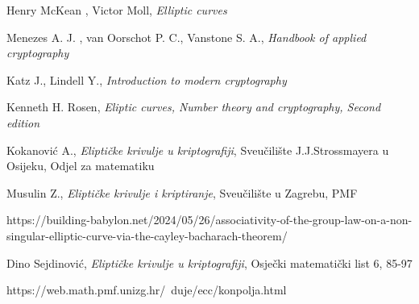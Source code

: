 \documentclass{mathos}
\begin{document}
\begin{thebibliography}{30}


{\sc Henry McKean , Victor Moll}, {\em Elliptic curves}

{\sc Menezes A. J. , van Oorschot P. C., Vanstone S. A.}, {\em Handbook of applied cryptography}

{\sc Katz J., Lindell Y.}, {\em Introduction to modern cryptography}

{\sc Kenneth H. Rosen}, {\em Eliptic curves, Number theory and cryptography, Second edition}

{\sc Kokanović A.}, {\em Eliptičke krivulje u kriptografiji}, Sveučilište J.J.Strossmayera u Osijeku, Odjel za matematiku

{\sc Musulin Z.}, {\em Eliptičke krivulje i kriptiranje}, Sveučilište u Zagrebu, PMF

https://building-babylon.net/2024/05/26/associativity-of-the-group-law-on-a-non-singular-elliptic-curve-via-the-cayley-bacharach-theorem/

{\sc Dino Sejdinović}, {\em Eliptičke krivulje u kriptografiji}, Osječki matematički list 6, 85-97

https://web.math.pmf.unizg.hr/~duje/ecc/konpolja.html

\end{thebibliography}
\end{document}
